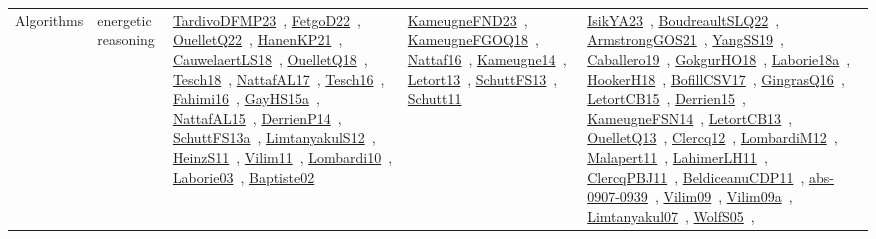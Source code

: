{\begin{longtable}{lp{3cm}>{\raggedright\arraybackslash}p{6cm}>{\raggedright\arraybackslash}p{6cm}>{\raggedright\arraybackslash}p{8cm}}
Algorithms & energetic reasoning & \href{works/TardivoDFMP23.pdf}{TardivoDFMP23}~\cite{TardivoDFMP23}, \href{works/FetgoD22.pdf}{FetgoD22}~\cite{FetgoD22}, \href{works/OuelletQ22.pdf}{OuelletQ22}~\cite{OuelletQ22}, \href{works/HanenKP21.pdf}{HanenKP21}~\cite{HanenKP21}, \href{works/CauwelaertLS18.pdf}{CauwelaertLS18}~\cite{CauwelaertLS18}, \href{works/OuelletQ18.pdf}{OuelletQ18}~\cite{OuelletQ18}, \href{works/Tesch18.pdf}{Tesch18}~\cite{Tesch18}, \href{works/NattafAL17.pdf}{NattafAL17}~\cite{NattafAL17}, \href{works/Tesch16.pdf}{Tesch16}~\cite{Tesch16}, \href{works/Fahimi16.pdf}{Fahimi16}~\cite{Fahimi16}, \href{works/GayHS15a.pdf}{GayHS15a}~\cite{GayHS15a}, \href{works/NattafAL15.pdf}{NattafAL15}~\cite{NattafAL15}, \href{works/DerrienP14.pdf}{DerrienP14}~\cite{DerrienP14}, \href{works/SchuttFS13a.pdf}{SchuttFS13a}~\cite{SchuttFS13a}, \href{works/LimtanyakulS12.pdf}{LimtanyakulS12}~\cite{LimtanyakulS12}, \href{works/HeinzS11.pdf}{HeinzS11}~\cite{HeinzS11}, \href{works/Vilim11.pdf}{Vilim11}~\cite{Vilim11}, \href{works/Lombardi10.pdf}{Lombardi10}~\cite{Lombardi10}, \href{works/Laborie03.pdf}{Laborie03}~\cite{Laborie03}, \href{works/Baptiste02.pdf}{Baptiste02}~\cite{Baptiste02} & \href{works/KameugneFND23.pdf}{KameugneFND23}~\cite{KameugneFND23}, \href{works/KameugneFGOQ18.pdf}{KameugneFGOQ18}~\cite{KameugneFGOQ18}, \href{works/Nattaf16.pdf}{Nattaf16}~\cite{Nattaf16}, \href{works/Kameugne14.pdf}{Kameugne14}~\cite{Kameugne14}, \href{works/Letort13.pdf}{Letort13}~\cite{Letort13}, \href{works/SchuttFS13.pdf}{SchuttFS13}~\cite{SchuttFS13}, \href{works/Schutt11.pdf}{Schutt11}~\cite{Schutt11} & \href{works/IsikYA23.pdf}{IsikYA23}~\cite{IsikYA23}, \href{works/BoudreaultSLQ22.pdf}{BoudreaultSLQ22}~\cite{BoudreaultSLQ22}, \href{works/ArmstrongGOS21.pdf}{ArmstrongGOS21}~\cite{ArmstrongGOS21}, \href{works/YangSS19.pdf}{YangSS19}~\cite{YangSS19}, \href{works/Caballero19.pdf}{Caballero19}~\cite{Caballero19}, \href{works/GokgurHO18.pdf}{GokgurHO18}~\cite{GokgurHO18}, \href{works/Laborie18a.pdf}{Laborie18a}~\cite{Laborie18a}, \href{works/HookerH18.pdf}{HookerH18}~\cite{HookerH18}, \href{works/BofillCSV17.pdf}{BofillCSV17}~\cite{BofillCSV17}, \href{works/GingrasQ16.pdf}{GingrasQ16}~\cite{GingrasQ16}, \href{works/LetortCB15.pdf}{LetortCB15}~\cite{LetortCB15}, \href{works/Derrien15.pdf}{Derrien15}~\cite{Derrien15}, \href{works/KameugneFSN14.pdf}{KameugneFSN14}~\cite{KameugneFSN14}, \href{works/LetortCB13.pdf}{LetortCB13}~\cite{LetortCB13}, \href{works/OuelletQ13.pdf}{OuelletQ13}~\cite{OuelletQ13}, \href{works/Clercq12.pdf}{Clercq12}~\cite{Clercq12}, \href{works/LombardiM12.pdf}{LombardiM12}~\cite{LombardiM12}, \href{works/Malapert11.pdf}{Malapert11}~\cite{Malapert11}, \href{works/LahimerLH11.pdf}{LahimerLH11}~\cite{LahimerLH11}, \href{works/ClercqPBJ11.pdf}{ClercqPBJ11}~\cite{ClercqPBJ11}, \href{works/BeldiceanuCDP11.pdf}{BeldiceanuCDP11}~\cite{BeldiceanuCDP11}, \href{works/abs-0907-0939.pdf}{abs-0907-0939}~\cite{abs-0907-0939}, \href{works/Vilim09.pdf}{Vilim09}~\cite{Vilim09}, \href{works/Vilim09a.pdf}{Vilim09a}~\cite{Vilim09a}, \href{works/Limtanyakul07.pdf}{Limtanyakul07}~\cite{Limtanyakul07}, \href{works/WolfS05.pdf}{WolfS05}~\cite{WolfS05}, 
\end{longtable}}
